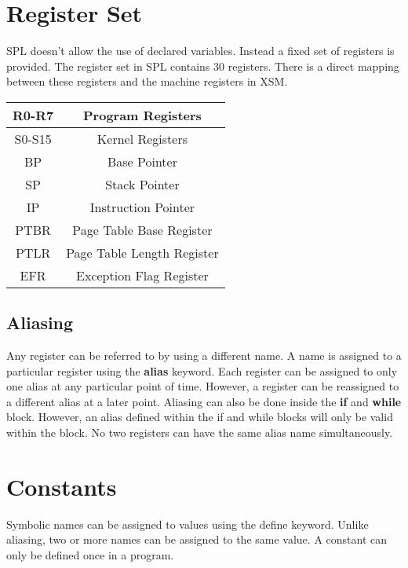 \documentclass[11pt]{article}
\begin{document}
\section{Register Set}

SPL doesn’t allow the use of declared variables. Instead a fixed set of registers is provided. The register set in SPL contains 30 registers. There is a direct mapping between these registers and the machine registers in XSM.  \\

\begin{center}
\begin{tabular}{| c | c | }
\hline
R0-R7 & Program Registers \\
\hline
S0-S15 & Kernel Registers \\
\hline
BP 		& Base Pointer \\
\hline
SP		& Stack Pointer \\
\hline
IP		& Instruction Pointer \\
\hline
PTBR 	& Page Table Base Register \\
\hline
PTLR & Page Table Length Register \\
\hline
EFR & Exception Flag Register \\
\hline
\end{tabular}
\end{center}

\subsection{Aliasing}
Any register can be referred to by using a different name. A name is assigned to a particular register using the \textbf{alias} keyword. Each register can be assigned to only one alias at any particular point of time. However, a register can be reassigned to a different alias at a later point. Aliasing can also be done inside the \textbf{if} and \textbf{while} block. However, an alias defined within the if and while blocks will only be valid within the block. No two registers can have the same alias name simultaneously.



\section{Constants}
Symbolic names can be assigned to values using the define keyword. Unlike aliasing, two or more names can be assigned to the same value. A constant can only be defined once in a program.
\end{document}
